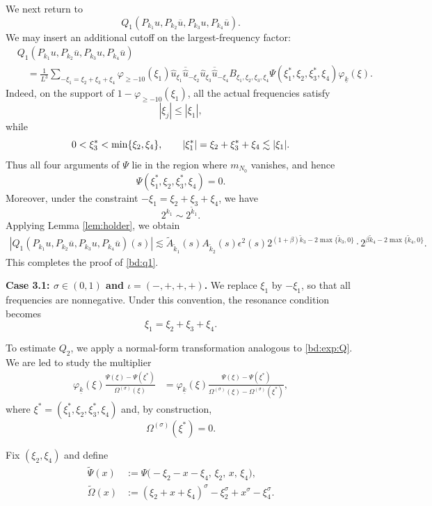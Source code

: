 \documentclass[UTF-8,reqno]{amsart}
\numberwithin{equation}{section}
\theoremstyle{definition}
\def\min{{\mathord{{\rm min}}}}
\def\geq{\geqslant}
\def\leq{\leqslant}
\def\min{{\mathord{{\rm min}}}}
\def\geq{\geqslant}
\def\leq{\leqslant}
\begin{document}
We next return to
\[
    Q_1(P_{k_1}u,P_{k_2}\overline u,
        P_{k_3}u,P_{k_4}\overline u).
\]
We may insert an additional cutoff on the largest-frequency factor:
\begin{align*}
&Q_1(P_{k_1}u,P_{k_2}\overline u,
     P_{k_3}u,P_{k_4}\overline u)
\\
&\quad
=
\frac{1}{L^3}
\sum_{-\xi_1=\xi_2+\xi_3+\xi_4}
\varphi_{\geq-10}(\xi_1)
\widehat u_{\xi_1}
\overline{\widehat u}_{-\xi_2}
\widehat u_{\xi_3}
\overline{\widehat u}_{-\xi_4}
B_{\xi_1,\xi_2,\xi_3,\xi_4} 
\Psi(\xi_1^*,\xi_2,\xi_3^*,\xi_4)
\varphi_{\underline{k}}(\xi).
\end{align*}
Indeed, on the support of $1-\varphi_{\geq-10}(\xi_1)$, all the
actual frequencies satisfy
\[
    |\xi_j|\leq|\xi_1|,
\]
while
\[
    0<\xi_3^*<\min\{\xi_2,\xi_4\},
    \qquad
    |\xi_1^*|
    =
    \xi_2+\xi_3^*+\xi_4
    \lesssim|\xi_1|.
\]
Thus all four arguments of $\Psi$ lie in the region where
$m_{N_0}$ vanishes, and hence
\[
    \Psi(\xi_1^*,\xi_2,\xi_3^*,\xi_4)=0.
\]
 Moreover, under the constraint $-\xi_1 = \xi_2 + \xi_3 + \xi_4$, we have 
\[
2^{k_1}\sim 2^{\tilde{k}_1}.
\]
Applying Lemma \ref{lem:holder}, we obtain
\begin{align*}
 |Q_1(P_{k_1}u,P_{k_2}\overline u,P_{k_3}u,P_{k_4}\overline u)(s)|\lesssim \tilde{ A}_{\tilde k_1}(s)A_{\tilde k_2}(s)\epsilon^2(s)2^{(1+\beta) \tilde{k}_3-2\max\{\tilde{k}_3,0\}}\cdot 2^{\beta \tilde{k}_4-2\max\{\tilde{k}_4,0\}}.
\end{align*}
 This completes the proof of \eqref{bd:q1}.

\textbf{Case 3.1: $\sigma\in(0,1)$ and
$\iota=(-,+,+,+)$.}
We replace $\xi_1$ by $-\xi_1$, so that all frequencies are
nonnegative. Under this convention, the resonance condition becomes
\[
    \xi_1=\xi_2+\xi_3+\xi_4.
\]

To estimate $Q_2$, we apply a normal-form transformation analogous to
\eqref{bd:exp:Q}. We are led to study the multiplier
\begin{align}
\varphi_{\underline k}(\xi)
\frac{\Psi(\xi)-\Psi(\xi^*)}{\Omega^{(\sigma)}(\xi)}
&=
\varphi_{\underline{k}}(\xi)
\frac{\Psi(\xi)-\Psi(\xi^*)}
     {\Omega^{(\sigma)}(\xi)-\Omega^{(\sigma)}(\xi^*)},
\label{eq:case31-difference-quotient}
\end{align}
where $ \xi^*=(\xi_1^*,\xi_2,\xi_3^*,\xi_4)$ 
and, by construction,
\[
    \Omega^{(\sigma)}(\xi^*)=0.
\]

Fix $(\xi_2,\xi_4)$ and define
\begin{align*}
\widetilde\Psi(x)
&:=
\Psi\bigl(
    -\xi_2-x-\xi_4,\,
    \xi_2,\,
    x,\,
    \xi_4
\bigr),
\\
\widetilde\Omega(x)
&:=
(\xi_2+x+\xi_4)^\sigma
-\xi_2^\sigma+x^\sigma-\xi_4^\sigma.
\end{align*}
 
\end{document}
